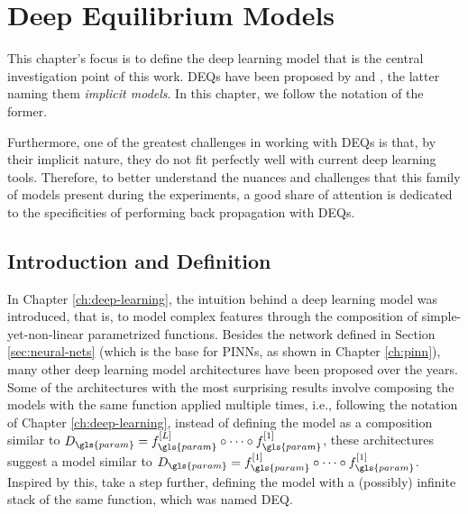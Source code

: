 \chapter{Deep Equilibrium Models}\label{ch:deq}

This chapter's focus is to define the deep learning model that is the central investigation point of this work.
\glspl{DEQ} have been proposed by \textcite{Bai2019} and \textcite{Ghaoui2019}, the latter naming them \emph{implicit models}.
In this chapter, we follow the notation of the former.

Furthermore, one of the greatest challenges in working with \gls{DEQ}s is that, by their implicit nature, they do not fit perfectly well with current deep learning tools.
Therefore, to better understand the nuances and challenges that this family of models present during the experiments, a good share of attention is dedicated to the specificities of performing back propagation with \gls{DEQ}s.

\section{Introduction and Definition}\label{sec:deq-definition}

In Chapter \ref{ch:deep-learning}, the intuition behind a deep learning model was introduced, that is, to model complex features through the composition of simple-yet-non-linear parametrized functions.
Besides the network defined in Section \ref{sec:neural-nets} (which is the base for \gls{PINN}s, as shown in Chapter \ref{ch:pinn}), many other deep learning model architectures have been proposed over the years.
    Some of the architectures with the most surprising results involve composing the models with the same function applied multiple times, i.e., following the notation of Chapter \ref{ch:deep-learning}, instead of defining the model as a composition similar to $D_{\gls{param}}=f_{\gls{param}}^{[L]}\circ \cdots \circ f_{\gls{param}}^{[1]}$, these architectures suggest a model similar to $D_{\gls{param}}=f_{\gls{param}}^{[1]}\circ \cdots \circ f_{\gls{param}}^{[1]}$.
Inspired by this, \textcite{Bai2019} take a step further, defining the model with a (possibly) infinite stack of the same function, which was named \gls{DEQ}.

